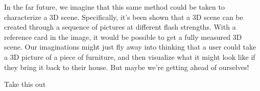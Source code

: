 \documentclass[10pt,twocolumn,letterpaper]{article}
\begin{document}
In the far future, we imagine that this same method could be taken to characterize a 3D scene. Specifically, it’s been shown that a 3D scene can be created through a sequence of pictures at different flash strengths. With a reference card in the image, it would be possible to get a fully measured 3D scene. Our imaginations might just fly away into thinking that a user could take a 3D picture of a piece of furniture, and then visualize what it might look like if they bring it back to their house. But maybe we’re getting ahead of ourselves!




Take this out \cite{Authors13}



\clearpage
{\small


}
\end{document}
